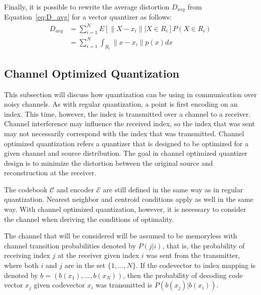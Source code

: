 \documentclass[10pt]{article}
\begin{document}
Finally, it is possible to rewrite the average distortion $D_{avg}$ from Equation~\ref{eq:D_avg} for a vector quantizer as follows:
\begin{align}
D_{avg} &= \sum_{i=1}^{N} E[ \|X - x_i\| | X \in R_i] P(X \in R_i) \\
&= \sum_{i=1}^{N} \int_{R_i} \|x - x_i\| p(x) dx
\end{align}

\subsection{Channel Optimized Quantization}
\label{sec:channel_optimized}
This subsection will discuss how quantization can be using in communication over noisy channels. As with regular quantization, a point is first encoding on an index. This time, however, the index is transmitted over a channel to a receiver. Channel interference may influence the received index, so the index that was sent may not necessarily correspond with the index that was transmitted. Channel optimized quantization refers a quantizer that is designed to be optimized for a given channel and source distribution. The goal in channel optimized quantizer design is to minimize the distortion between the original source and reconstruction at the receiver.

The codebook $\mathcal{C}$ and encoder $\mathcal{E}$ are still defined in the same way as in regular quantization. Nearest neighbor and centroid conditions apply as well in the same way. With channel optimized quantization, however, it is necessary to consider the channel when deriving the conditions of optimality.

The channel that will be considered will be assumed to be memoryless with channel transition probabilities denoted by $P(j|i)$, that is, the probability of receiving index $j$ at the receiver given index $i$ was sent from the transmitter, where both $i$ and $j$ are in the set $\{1,\ldots,N\}$. If the codevector to index mapping is denoted by $b = (b(x_1),\ldots,b(x_N))$, then the probability of decoding code vector $x_j$ given codevector $x_i$ was transmitted is $P(b(x_j)|b(x_i))$.
\end{document}

